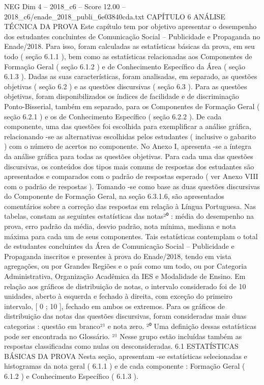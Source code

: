 \begin{textsample}{NEG Dim 4 – 2018\_c6 – Score 12.00 – 2018\_c6/enade\_2018\_publi\_6e03840cda.txt}  \label{ex:f4_neg_342}
CAPÍTULO 6 ANÁLISE TÉCNICA DA PROVA Este capítulo tem por objetivo apresentar o desempenho dos estudantes concluintes de Comunicação Social – Publicidade e Propaganda no Enade/2018.
Para isso, foram calculadas as estatísticas básicas da prova, em seu todo ( seção 6.1.1 ), bem como as estatísticas relacionadas aos Componentes de Formação Geral ( seção 6.1.2 ) e de Conhecimento Específico da Área ( seção 6.1.3 ).
Dadas as suas características, foram analisadas, em separado, as questões objetivas ( seção 6.2 ) e as questões discursivas ( seção 6.3 ).
Para as questões objetivas, foram disponibilizados os índices de facilidade e de discriminação Ponto-Bisserial, também em separado, para os Componentes de Formação Geral ( seção 6.2.1 ) e os de Conhecimento Específico ( seção 6.2.2 ).
De cada componente, uma das questões foi escolhida para exemplificar a análise gráfica, relacionando -se as alternativas escolhidas pelos estudantes ( inclusive o gabarito ) com o número de acertos no componente.
No Anexo I, apresenta -se a íntegra da análise gráfica para todas as questões objetivas.
Para cada uma das questões discursivas, os conteúdos dos tipos mais comuns de respostas dos estudantes são apresentados e comparados com o padrão de respostas esperado ( ver Anexo VIII com o padrão de respostas ).
Tomando -se como base as duas questões discursivas do Componente de Formação Geral, na seção 6.3.1.6, são apresentados comentários sobre a correção das respostas em relação à Língua Portuguesa.
Nas tabelas, constam as seguintes estatísticas das notas²⁰ : média do desempenho na prova, erro padrão da média, desvio padrão, nota mínima, mediana e nota máxima para cada um de seus componentes.
Tais estatísticas contemplam o total de estudantes concluintes da Área de Comunicação Social – Publicidade e Propaganda inscritos e presentes à prova do Enade/2018, tendo em vista agregações, ou por Grandes Regiões e o país como um todo, ou por Categoria Administrativa, Organização Acadêmica da IES e Modalidade de Ensino.
Em relação aos gráficos de distribuição de notas, o intervalo considerado foi de 10 unidades, aberto à esquerda e fechado à direita, com exceção do primeiro intervalo, [ 0 ; 10 ], fechado em ambos os extremos.
Para os gráficos de distribuição das notas das questões discursivas, foram consideradas mais duas categorias : questão em branco²¹ e nota zero. ²⁰ Uma definição dessas estatísticas pode ser encontrada no Glossário. ²¹ Nesse grupo estão incluídas também as respostas classificadas como nulas ou desconsideradas. 6.1 ESTATÍSTICAS BÁSICAS DA PROVA Nesta seção, apresentam -se estatísticas selecionadas e histogramas da nota geral ( 6.1.1 ) e de cada componente : Formação Geral ( 6.1.2 ) e Conhecimento Específico ( 6.1.3 ).

\end{textsample}
